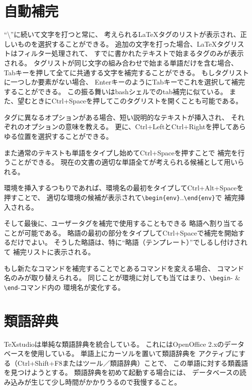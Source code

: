 \section{自動補完}

``\textbackslash{}''に続いて文字を打つと常に、
考えられるLaTeXタグのリストが表示され、正しいものを選択することができる。
追加の文字を打った場合、LaTeXタグリストはフィルター処理されて、
すでに書かれたテキストで始まるタグのみが表示される。
タグリストが同じ文字の組み合わせで始まる単語だけを含む場合、
Tabキーを押して全てに共通する文字を補完することができる。
もしタグリストに一つしか要素がない場合、
EnterキーのようにTabキーでこれを選択して補完することができる。
この振る舞いはbashシェルでのtab補完に似ている。
また、望むときにCtrl+Spaceを押してこのタグリストを開くことも可能である。

タグに異なるオプションがある場合、短い説明的なテキストが挿入され、
それぞれのオプションの意味を教える。
更に、Ctrl+LeftとCtrl+Rightを押してあらゆる位置を選択することができる。

また通常のテキストも単語をタイプし始めてCtrl+Spaceを押すことで
補完を行うことができる。
現在の文書の適切な単語全てが考えられる候補として用いられる。

環境を挿入するつもりであれば、環境名の最初をタイプしてCtrl+Alt+Spaceを押すことで、
適切な環境の候補が表示されて\verb+\begin{env}+..\verb+\end{env}+で
補完挿入される。

そして最後に、ユーザータグを補完で使用することもできる
略語へ割り当てることが可能である。
略語の最初の部分をタイプしてCtrl+Spaceで補完を開始するだけでよい。
そうした略語は、特に``略語（テンプレート）''でしるし付けされて
補完リストに表示される。

もし新たなコマンドを補完することでとあるコマンドを変える場合、
コマンド名のみが取り替えられる。
同じことが環境に対しても当てはまり、\verb+\begin+- \& \verb+\end+-コマンド内の
環境名が変化する。

\section{類語辞典}

TeXstudioは単純な類語辞典を統合している。
これにはOpenOffice 2.xのデータベースを使用している。
単語上にカーソルを置いて類語辞典を
アクティブにする（Ctrl+Shift+F8またはツール／類語辞典）ことで、
この単語に対する類義語を見つけようとする。
類語辞典を初めて起動する場合には、
データベースの読み込みが生じて少し時間がかかりうるので我慢すること。

